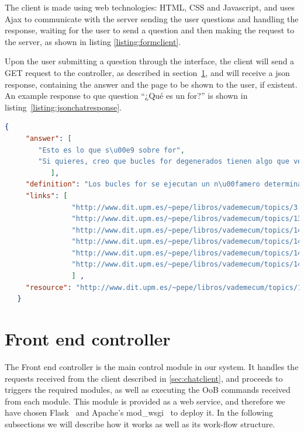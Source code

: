 The client is made using web technologies: HTML, CSS and Javascript, and uses Ajax to communicate with the server sending the user questions and handling the response, waiting for the user to send a question and then making the request to the server, as shown in listing \ref{listing:formclient}.


\begin{center}
  
\end{center}

Upon the user submitting a question through the interface, the client will send a GET request to the controller, as described in section~\ref{sec:frontendcon}, and will receive a json response, containing the answer and the page to be shown to the user, if existent. An example response to que question ``¿Qué es un for?'' is shown in listing~\ref{listing:jsonchatresponse}.

\begin{center} 
  \begin{lstlisting}[language=json, caption=Example response for the chat client, label=listing:jsonchatresponse]
   {
     "answer": [
		"Esto es lo que s\u00e9 sobre for",
		"Si quieres, creo que bucles for degenerados tienen algo que ver con esto"
	       ],
     "definition": "Los bucles for se ejecutan un n\u00famero determinado de veces",
     "links": [
                "http://www.dit.upm.es/~pepe/libros/vademecum/topics/3.html",
                "http://www.dit.upm.es/~pepe/libros/vademecum/topics/139.html",
                "http://www.dit.upm.es/~pepe/libros/vademecum/topics/140.html",
                "http://www.dit.upm.es/~pepe/libros/vademecum/topics/141.html",
                "http://www.dit.upm.es/~pepe/libros/vademecum/topics/142.html",
                "http://www.dit.upm.es/~pepe/libros/vademecum/topics/143.html"
                ] ,
     "resource": "http://www.dit.upm.es/~pepe/libros/vademecum/topics/138.html"
   }  
  \end{lstlisting}
\end{center}

\section{Front end controller}
\label{sec:frontendcon}
The Front end controller is the main control module in our system. It handles the requests received from the client described in \ref{sec:chatclient}, and proceeds to triggers the required modules, as well as executing the \ac{OoB} commands received from each module. This module is provided as a web service, and therefore we have chosen Flask~\cite{flask0101} and Apache's mod\_wsgi~\cite{modwsgi} to deploy it. In the following subsections we will describe how it works as well as its work-flow structure.

